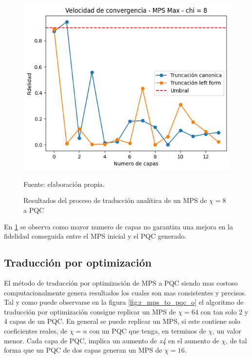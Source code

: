 \begin{figure}[!h]
    \centering
    \includegraphics[scale = 0.7]{plt/a03-mps_to_pqc_a_2.png}
    \caption{Resultados del proceso de traducción analítica de un MPS de $\chi = 8$ a PQC}
    Fuente: elaboración propia.
    \label{fig:r_mps_to_pqc_a_2}
\end{figure}

En \ref{fig:r_mps_to_pqc_a_2} se observa como mayor numero de capas no garantiza una mejora en la fidelidad conseguida entre el MPS inicial y el PQC generado.

\subsection{Traducción por optimización}

El método de traducción por optimización de MPS a PQC siendo mas costoso computacionalmente genera resultados los cuales son mas consistentes y precisos. Tal y como puede observarse en la figura \ref{fig:r_mps_to_pqc_o} el algoritmo de traducción por optimización consigue replicar un MPS de $\chi = 64$ con tan solo 2 y 4 capas de un PQC. En general se puede replicar un MPS, si este contiene solo coeficientes reales, de $\chi = n$ con un PQC que tenga, en terminos de $\chi$, un valor menor. Cada capa de PQC, implica un aumento de \textit{x4} en el aumento de $\chi$, de tal forma que un PQC de dos capas generan un MPS de $\chi = 16$.

\newpage


